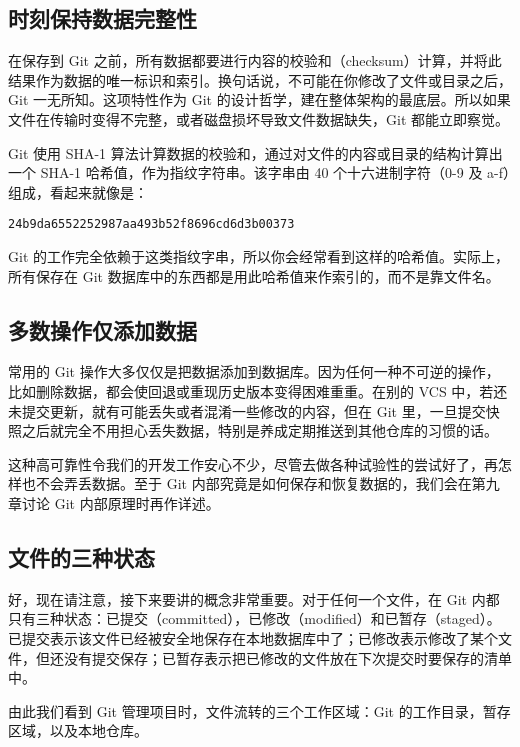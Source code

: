 \documentclass[a4paper]{book}
\begin{document}
\subsection{时刻保持数据完整性}

在保存到 Git 之前，所有数据都要进行内容的校验和（checksum）计算，并将此结果作为数据的唯一标识和索引。换句话说，不可能在你修改了文件或目录之后，Git 一无所知。这项特性作为 Git 的设计哲学，建在整体架构的最底层。所以如果文件在传输时变得不完整，或者磁盘损坏导致文件数据缺失，Git 都能立即察觉。

Git 使用 SHA-1 算法计算数据的校验和，通过对文件的内容或目录的结构计算出一个 SHA-1 哈希值，作为指纹字符串。该字串由 40 个十六进制字符（0-9 及 a-f）组成，看起来就像是：

\begin{shaded}\begin{verbatim}
24b9da6552252987aa493b52f8696cd6d3b00373
\end{verbatim}\end{shaded}

Git 的工作完全依赖于这类指纹字串，所以你会经常看到这样的哈希值。实际上，所有保存在 Git 数据库中的东西都是用此哈希值来作索引的，而不是靠文件名。

\subsection{多数操作仅添加数据}

常用的 Git 操作大多仅仅是把数据添加到数据库。因为任何一种不可逆的操作，比如删除数据，都会使回退或重现历史版本变得困难重重。在别的 VCS 中，若还未提交更新，就有可能丢失或者混淆一些修改的内容，但在 Git 里，一旦提交快照之后就完全不用担心丢失数据，特别是养成定期推送到其他仓库的习惯的话。

这种高可靠性令我们的开发工作安心不少，尽管去做各种试验性的尝试好了，再怎样也不会弄丢数据。至于 Git 内部究竟是如何保存和恢复数据的，我们会在第九章讨论 Git 内部原理时再作详述。

\subsection{文件的三种状态}

好，现在请注意，接下来要讲的概念非常重要。对于任何一个文件，在 Git 内都只有三种状态：已提交（committed），已修改（modified）和已暂存（staged）。已提交表示该文件已经被安全地保存在本地数据库中了；已修改表示修改了某个文件，但还没有提交保存；已暂存表示把已修改的文件放在下次提交时要保存的清单中。

由此我们看到 Git 管理项目时，文件流转的三个工作区域：Git 的工作目录，暂存区域，以及本地仓库。
\end{document}
